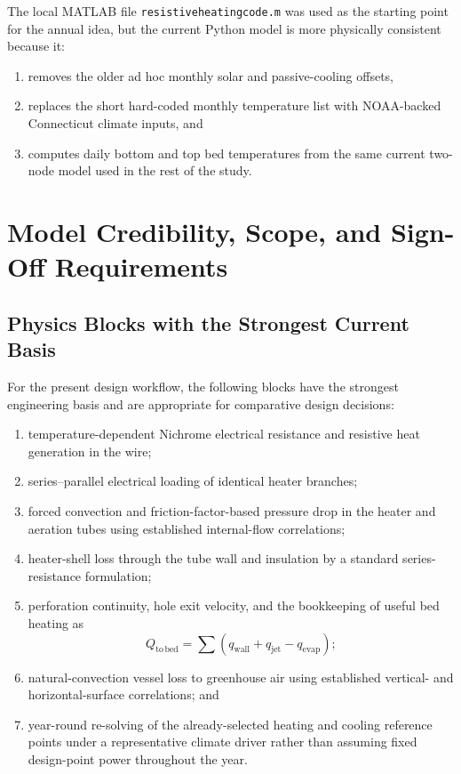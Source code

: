 \documentclass{article}
\begin{document}
The local MATLAB file \texttt{resistiveheatingcode.m} was used as the
starting point for the annual idea, but the current Python model is more
physically consistent because it:
\begin{enumerate}
\item removes the older ad hoc monthly solar and passive-cooling offsets,
\item replaces the short hard-coded monthly temperature list with NOAA-backed
Connecticut climate inputs, and
\item computes daily bottom and top bed temperatures from the same current
two-node model used in the rest of the study.
\end{enumerate}

\section{Model Credibility, Scope, and Sign-Off Requirements}

\subsection{Physics Blocks with the Strongest Current Basis}

For the present design workflow, the following blocks have the strongest
engineering basis and are appropriate for comparative design decisions:
\begin{enumerate}
\item temperature-dependent Nichrome electrical resistance and resistive heat
generation in the wire;
\item series--parallel electrical loading of identical heater branches;
\item forced convection and friction-factor-based pressure drop in the heater
and aeration tubes using established internal-flow correlations;
\item heater-shell loss through the tube wall and insulation by a standard
series-resistance formulation;
\item perforation continuity, hole exit velocity, and the bookkeeping of
useful bed heating as
\begin{equation}
Q_{\mathrm{to\,bed}}
=
\sum \left(q_{\mathrm{wall}} + q_{\mathrm{jet}} - q_{\mathrm{evap}}\right);
\end{equation}
\item natural-convection vessel loss to greenhouse air using established
vertical- and horizontal-surface correlations; and
\item year-round re-solving of the already-selected heating and cooling
reference points under a representative climate driver rather than assuming
fixed design-point power throughout the year.
\end{enumerate}
\end{document}
